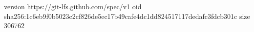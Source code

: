 version https://git-lfs.github.com/spec/v1
oid sha256:1c6eb9f0b5023c2cf826de5ec17b49cafe4dc1dd824517117dedafc3fdcb301c
size 306762
